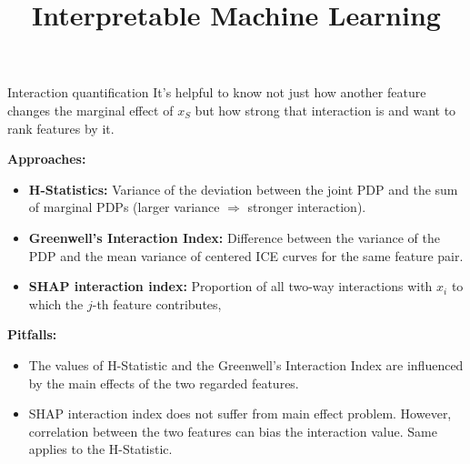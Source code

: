 \documentclass[11pt,compress,t,notes=noshow, aspectratio=169, xcolor=table,dvipsnames]{beamer}
\title{Interpretable Machine Learning}
\date{}
\begin{document}
\newcommand{\titlefigure}{figure/sim1_dt_split1.png}
\newcommand{\learninggoals}{
\item Interaction quantification
\item REPID interaction importance
}




\begin{frame}{Interaction quantification}
It's helpful to know not just how another feature changes the marginal effect of $x_S$ but how strong that interaction is and want to rank features by it.

\textbf{Approaches:}
\begin{itemize}
    \item \textbf{H-Statistics:} Variance of the deviation between the joint PDP and the sum of marginal PDPs (larger variance $\Rightarrow$ stronger interaction).
    \item \textbf{Greenwell’s Interaction Index:} Difference between the variance of the PDP and the mean variance of centered ICE curves for the same feature pair.
    \item \textbf{SHAP interaction index:} Proportion of all two-way interactions with $x_i$  to which the $j$-th feature contributes,
\end{itemize}

\pause

\textbf{Pitfalls:}
\begin{itemize}
    \item The values of H-Statistic and the Greenwell’s Interaction Index are influenced by the
 main effects of the two regarded features.
    \item SHAP interaction index does not suffer from main effect problem. However, correlation between the two features can bias the interaction value. Same applies to the H-Statistic.  
\end{itemize}

\end{frame}
\end{document}
